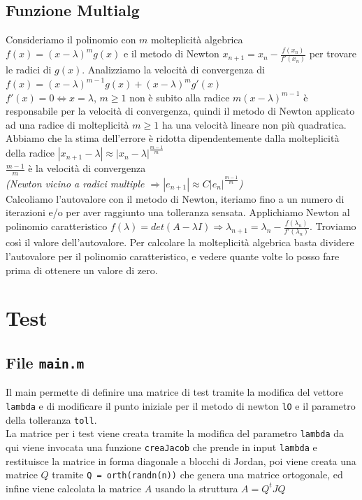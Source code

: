 \documentclass[12pt]{article}
\begin{document}
    \subsection{Funzione Multialg}
    Consideriamo il polinomio con $m$ molteplicità algebrica $f(x)=(x-\lambda)^m g(x)$ e il metodo di Newton $x_{n+1}=x_n - \frac{f(x_n)}{f'(x_n)}$ per trovare le radici di $g(x)$.
    Analizziamo la velocità di convergenza di $f(x)=(x-\lambda)^{m-1} g(x) + (x-\lambda)^m g'(x)$\\
    $f'(x) = 0 \iff x = \lambda$, $m \geq 1$ non è subito alla radice $m(x-\lambda)^{m-1}$ è responsabile per la velocità di convergenza, quindi il metodo di Newton applicato ad una radice di molteplicità $m\geq 1$ ha una velocità lineare non più quadratica.\\
    Abbiamo che la stima dell'errore è ridotta dipendentemente dalla molteplicità della radice $|x_{n+1}-\lambda| \approx |x_n - \lambda|^{\frac{m-1}{m}}$\\
    $\frac{m-1}{m}$ è la velocità di convergenza\\ \textit{(Newton vicino a radici multiple $\Rightarrow |e_{n+1}| \approx C|e_n|^{\frac{m-1}{m}}$)}\\
    Calcoliamo l'autovalore con il metodo di Newton, iteriamo fino a un numero di iterazioni e/o per aver raggiunto una tolleranza sensata. Applichiamo Newton al polinomio caratteristico $f(\lambda) = det(A-\lambda I) \Rightarrow \lambda_{n+1} = \lambda_n - \frac{f(\lambda_n)}{f'(\lambda_n)}$. Troviamo così il valore dell'autovalore.
    Per calcolare la molteplicità algebrica basta dividere l'autovalore per il polinomio caratteristico, e vedere quante volte lo posso fare prima di ottenere un valore di zero.
    \section{Test}
    \subsection{File \texttt{main.m}}
    Il main permette di definire una matrice di test tramite la modifica del vettore \texttt{lambda} e  di modificare il punto iniziale per il metodo di newton \texttt{lO} e il parametro della tolleranza \texttt{toll}.\\
    La matrice per i test viene creata tramite la modifica del parametro \texttt{lambda} da qui viene invocata una funzione \texttt{creaJacob} che prende in input \texttt{lambda} e restituisce la matrice in forma diagonale a blocchi di Jordan, poi viene creata una matrice $Q$ tramite \texttt{Q = orth(randn(n))} che genera una matrice ortogonale, ed infine viene calcolata la matrice $A$ usando la struttura $A=Q^tJQ$\\
    \newpage
\end{document}
